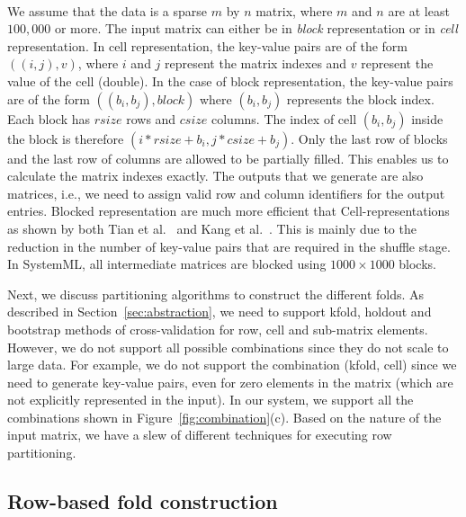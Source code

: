 \documentclass{vldb}
\newcommand{\topic}[1]{\par \smallskip \smallskip \noindent{\bf \uline{#1}}}
\begin{document}
\topic{Matrix structure}\\
We assume that the data is a sparse $m$ by $n$ matrix, where $m$ and $n$ are at least
$100,000$ or more. The input matrix can either be in {\em block} representation or in
{\em cell} representation. In
cell representation, the key-value pairs are of the form $((i,j), v)$, where $i$
and $j$ represent the matrix indexes and $v$ represent the value of the cell
(double). In
the case of block representation, the key-value pairs are of the form
$((b_i,b_j),block)$ where $(b_i,b_j)$ represents the block index. Each block has
$rsize$ rows and $csize$ columns.
The index of cell
$(b_i,b_j)$ inside the block is therefore $(i*rsize + b_i, j*csize + b_j)$. Only
the last row of blocks and the last row of columns are allowed to be partially
filled. This enables us to calculate the matrix indexes exactly.
The outputs that we generate are also matrices, i.e., we need to assign valid row and column
identifiers for the output entries. Blocked representation are much more
efficient that Cell-representations as shown by both Tian et
al.~\cite{DBLP:conf/icde/TianK11} and Kang et
al.~\cite{DBLP:conf/icdm/KangTF09}. This is mainly due to the reduction in the number of key-value
pairs that are required in the shuffle stage. In SystemML, all intermediate matrices are
blocked using $1000 \times 1000$ blocks.

Next, we discuss partitioning algorithms to construct the
different folds. As described in Section~\ref{sec:abstraction}, we need to support kfold,
holdout and bootstrap methods of cross-validation for row, cell and sub-matrix
elements. However, we do not support all possible combinations since they do not
scale to large data. For example,
we do not support the combination (kfold, cell) since we need to generate
key-value pairs, even for zero elements in the matrix (which are not explicitly
represented in the input). In our system, we support all the combinations shown in
Figure~\ref{fig:combination}(c). 
Based on the nature of the input matrix, we have a slew of different techniques for executing row
partitioning. 

\subsection{Row-based fold construction}
\label{sec:rowpartitioning}
\end{document}
